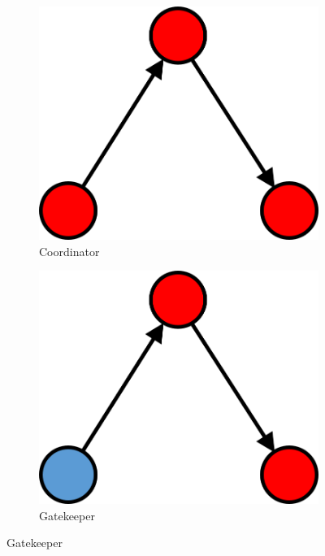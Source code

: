 \begin{figure}
\centering
  \begin{subfigure}[b]{0.25\textwidth}
    \includegraphics[width=\textwidth]{Images/w_I.png}
    \caption{Coordinator}
    \label{fig:1}
  \end{subfigure}
  \hspace{2em}
  \begin{subfigure}[b]{0.25\textwidth}
    \includegraphics[width=\textwidth]{Images/b_OI.png}
    \caption{Gatekeeper}
    \label{fig:2}
  \end{subfigure}

\end{figure}
